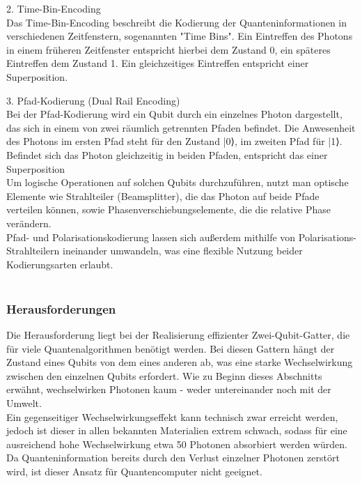 2. Time-Bin-Encoding \\
Das Time-Bin-Encoding beschreibt die Kodierung der Quanteninformationen in verschiedenen Zeitfenstern, sogenannten "Time Bins". 
Ein Eintreffen des Photons in einem früheren Zeitfenster entspricht hierbei dem Zustand 0, ein späteres Eintreffen dem Zustand 1. Ein gleichzeitiges Eintreffen entspricht einer Superposition. \\ \cite{obrien_optical_2007}

3. Pfad-Kodierung (Dual Rail Encoding)\\
Bei der Pfad-Kodierung wird ein Qubit durch ein einzelnes Photon dargestellt, das sich in einem von zwei räumlich getrennten Pfaden befindet. Die Anwesenheit des Photons im ersten Pfad steht für den Zustand |0⟩, im zweiten Pfad für |1⟩. Befindet sich das Photon gleichzeitig in beiden Pfaden, entspricht das einer Superposition\\

Um logische Operationen auf solchen Qubits durchzuführen, nutzt man optische Elemente wie Strahlteiler (Beamsplitter), die das Photon auf beide Pfade verteilen können, sowie Phasenverschiebungselemente, die die relative Phase verändern. \\

Pfad- und Polarisationskodierung lassen sich außerdem mithilfe von Polarisations-Strahlteilern ineinander umwandeln, was eine flexible Nutzung beider Kodierungsarten erlaubt.  \cite{nielsen_michael_a_and_isaac_l_chuang_quantum_2010}\\\\

\subsubsection{Herausforderungen}
Die Herausforderung liegt bei der Realisierung effizienter Zwei-Qubit-Gatter, die für viele Quantenalgorithmen benötigt werden. Bei diesen Gattern hängt der Zustand eines Qubits von dem eines anderen ab, was eine starke Wechselwirkung zwischen den einzelnen Qubits erfordert. Wie zu Beginn dieses Abschnitts erwähnt, wechselwirken Photonen kaum - weder untereinander noch mit der Umwelt. \\
Ein gegenseitiger Wechselwirkungseffekt kann technisch zwar erreicht werden, jedoch ist dieser in allen bekannten Materialien extrem schwach, sodass für eine ausreichend hohe Wechselwirkung etwa 50 Photonen absorbiert werden würden. Da Quanteninformation bereits durch den Verlust einzelner Photonen zerstört wird, ist dieser Ansatz für Quantencomputer nicht geeignet. \\

